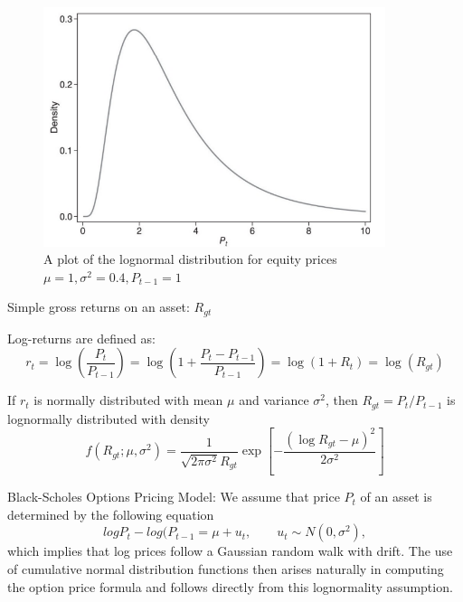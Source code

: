 \documentclass[11pt]{article}
\begin{document}
\begin{figure}[h]
    \centering
    \includegraphics[width=10cm]{pics/lognormal dist.png}
    \caption{A plot of the lognormal distribution for equity prices $\mu = 1, \sigma^2 = 0.4, P_{t-1} = 1$}
    \label{fig:lognormal distribution}
\end{figure}

\begin{example}
    Simple gross returns on an asset: $R_{gt}$

    Log-returns are defined as:
\begin{equation}
r_t=\log \left(\frac{P_t}{P_{t-1}}\right)=\log \left(1+\frac{P_t-P_{t-1}}{P_{t-1}}\right)=\log \left(1+R_t\right)=\log \left(R_{g t}\right)
\end{equation}

If $r_t$ is normally distributed with mean $\mu$ and variance $\sigma^2$, then $R_{gt} = P_t/P_{t-1}$ is lognormally distributed with density
\begin{equation}
f\left(R_{g t} ; \mu, \sigma^2\right)=\frac{1}{\sqrt{2 \pi \sigma^2} R_{g t}} \exp \left[-\frac{\left(\log R_{g t}-\mu\right)^2}{2 \sigma^2}\right]
\end{equation}
\end{example}

\begin{example}
    Black-Scholes Options Pricing Model:
    We assume that price $P_t$ of an asset is determined by the following equation
    \[log P_t - log(P_{t-1} = \mu + u_t, \qquad u_t \sim N(0,\sigma^2),\]
    which implies that log prices follow a Gaussian random walk with drift. The use of cumulative normal distribution functions then arises naturally in computing the option price formula and follows directly from this lognormality assumption.
\end{example}
\end{document}
